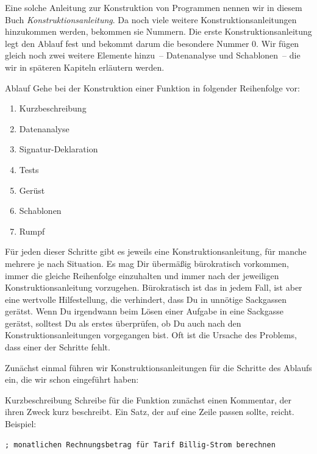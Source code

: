 Eine solche Anleitung zur Konstruktion von Programmen nennen wir in
diesem Buch
\textit{Konstruktionsanleitung}.  Da
noch viele weitere Konstruktionsanleitungen hinzukommen werden,
bekommen sie Nummern.  Die erste Konstruktionsanleitung legt den
Ablauf fest und bekommt darum die besondere Nummer 0.
Wir fügen gleich noch zwei weitere Elemente
hinzu~-- Datenanalyse und Schablonen~-- die wir in späteren Kapiteln
erläutern werden.

\setcounter{xkonstruktionsanleitung}{-1}

\begin{konstruktionsanleitung}{Ablauf}
  Gehe bei der Konstruktion einer Funktion in folgender Reihenfolge
  vor:
  \begin{enumerate}
    \item Kurzbeschreibung
    \item Datenanalyse
    \item Signatur-Deklaration
    \item Tests
    \item Gerüst
    \item Schablonen
    \item Rumpf
    \end{enumerate}
\end{konstruktionsanleitung}
%
Für jeden dieser Schritte gibt es jeweils eine Konstruktionsanleitung,
für manche mehrere je nach Situation.  Es mag Dir übermäßig
bürokratisch vorkommen, immer die gleiche Reihenfolge einzuhalten und
immer nach der jeweiligen Konstruktionsanleitung vorzugehen.
Bürokratisch ist das in jedem Fall, ist aber eine wertvolle
Hilfestellung, die verhindert, dass Du in unnötige Sackgassen
gerätst.  Wenn Du irgendwann beim Lösen einer Aufgabe in
eine Sackgasse gerätst, solltest Du als erstes überprüfen, ob Du auch
nach den Konstruktionsanleitungen vorgegangen bist.  Oft ist die
Ursache des Problems, dass einer der Schritte fehlt.

Zunächst einmal führen wir Konstruktionsanleitungen für die Schritte
des Ablaufs ein, die wir schon eingeführt haben:

\begin{konstruktionsanleitung}{Kurzbeschreibung}
  \label{ka:kurzbeschreibung}
  Schreibe für die Funktion zunächst einen Kommentar, der ihren Zweck
  kurz beschreibt.  Ein Satz, der auf eine Zeile passen sollte,
  reicht.  Beispiel:
\begin{verbatim}
; monatlichen Rechnungsbetrag für Tarif Billig-Strom berechnen
\end{verbatim}
\end{konstruktionsanleitung}

